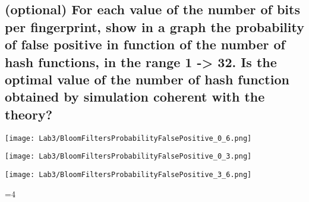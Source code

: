 \documentclass{report}
\newcounter{debug}
\begin{document}
{%


				\subsection{(optional) For each value of the number of bits per fingerprint, show in a graph the probability of false positive in function of the number of hash functions, in the range 1 -> 32. Is the optimal value of the number of hash function obtained by simulation coherent with the theory?}
				\texttt{[image: Lab3/BloomFiltersProbabilityFalsePositive\_0\_6.png]}
				\begin{minipage}{0.45\textwidth}
						\texttt{[image: Lab3/BloomFiltersProbabilityFalsePositive\_0\_3.png]}
				\end{minipage}
				\begin{minipage}{0.45\textwidth}
						\texttt{[image: Lab3/BloomFiltersProbabilityFalsePositive\_3\_6.png]}
				\end{minipage}
				
} \fi

\ifnum\value{debug}=4 {
} \fi
\end{document}
